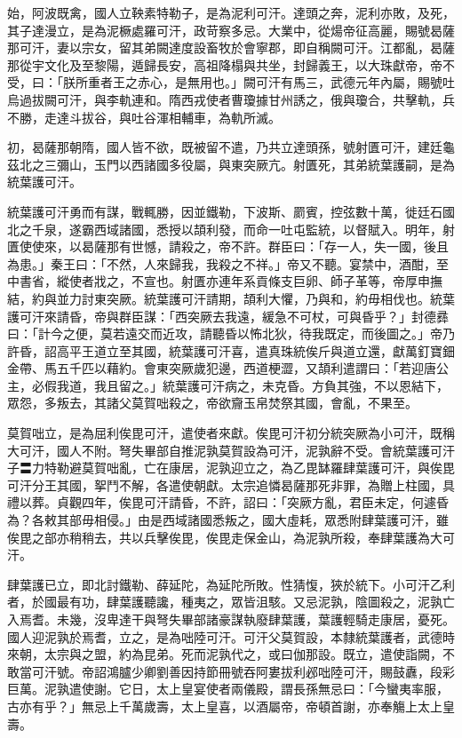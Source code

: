 \begin{pinyinscope}
 始，阿波既禽，國人立鞅素特勒子，是為泥利可汗。達頭之奔，泥利亦敗，及死，其子達漫立，是為泥橛處羅可汗，政苛察多忌。大業中，從煬帝征高麗，賜號曷薩那可汗，妻以宗女，留其弟闕達度設畜牧於會寧郡，即自稱闕可汗。江都亂，曷薩那從宇文化及至黎陽，遁歸長安，高祖降榻與共坐，封歸義王，以大珠獻帝，帝不受，曰：「朕所重者王之赤心，是無用也。」闕可汗有馬三，武德元年內屬，賜號吐烏過拔闕可汗，與李軌連和。隋西戎使者曹瓊據甘州誘之，俄與瓊合，共擊軌，兵不勝，走達斗拔谷，與吐谷渾相輔車，為軌所滅。



 初，曷薩那朝隋，國人皆不欲，既被留不遣，乃共立達頭孫，號射匱可汗，建廷龜茲北之三彌山，玉門以西諸國多役屬，與東突厥亢。射匱死，其弟統葉護嗣，是為統葉護可汗。



 統葉護可汗勇而有謀，戰輒勝，因並鐵勒，下波斯、罽賓，控弦數十萬，徙廷石國北之千泉，遂霸西域諸國，悉授以頡利發，而命一吐屯監統，以督賦入。明年，射匱使使來，以曷薩那有世憾，請殺之，帝不許。群臣曰：「存一人，失一國，後且為患。」秦王曰：「不然，人來歸我，我殺之不祥。」帝又不聽。宴禁中，酒酣，至中書省，縱使者戕之，不宣也。射匱亦連年系貢條支巨卵、師子革等，帝厚申撫結，約與並力討東突厥。統葉護可汗請期，頡利大懼，乃與和，約毋相伐也。統葉護可汗來請昏，帝與群臣謀：「西突厥去我遠，緩急不可杖，可與昏乎？」封德彞曰：「計今之便，莫若遠交而近攻，請聽昏以怖北狄，待我既定，而後圖之。」帝乃許昏，詔高平王道立至其國，統葉護可汗喜，遣真珠統俟斤與道立還，獻萬釘寶鈿金帶、馬五千匹以藉約。會東突厥歲犯邊，西道梗澀，又頡利遣謂曰：「若迎唐公主，必假我道，我且留之。」統葉護可汗病之，未克昏。方負其強，不以恩結下，眾怨，多叛去，其諸父莫賀咄殺之，帝欲齎玉帛焚祭其國，會亂，不果至。



 莫賀咄立，是為屈利俟毘可汗，遣使者來獻。俟毘可汗初分統突厥為小可汗，既稱大可汗，國人不附。弩失畢部自推泥孰莫賀設為可汗，泥孰辭不受。會統葉護可汗子〓力特勒避莫賀咄亂，亡在康居，泥孰迎立之，為乙毘缽羅肆葉護可汗，與俟毘可汗分王其國，挐鬥不解，各遣使朝獻。太宗追憐曷薩那死非罪，為贈上柱國，具禮以葬。貞觀四年，俟毘可汗請昏，不許，詔曰：「突厥方亂，君臣未定，何遽昏為？各敕其部毋相侵。」由是西域諸國悉叛之，國大虛耗，眾悉附肆葉護可汗，雖俟毘之部亦稍稍去，共以兵擊俟毘，俟毘走保金山，為泥孰所殺，奉肆葉護為大可汗。



 肆葉護已立，即北討鐵勒、薛延陀，為延陀所敗。性猜愎，狹於統下。小可汗乙利者，於國最有功，肆葉護聽讒，種夷之，眾皆沮駭。又忌泥孰，陰圖殺之，泥孰亡入焉耆。未幾，沒卑達干與弩失畢部諸豪謀執廢肆葉護，葉護輕騎走康居，憂死。國人迎泥孰於焉耆，立之，是為咄陸可汗。可汗父莫賀設，本隸統葉護者，武德時來朝，太宗與之盟，約為昆弟。死而泥孰代之，或曰伽那設。既立，遣使詣闕，不敢當可汗號。帝詔鴻臚少卿劉善因持節冊號吞阿婁拔利邲咄陸可汗，賜鼓纛，段彩巨萬。泥孰遣使謝。它日，太上皇宴使者兩儀殿，謂長孫無忌曰：「今蠻夷率服，古亦有乎？」無忌上千萬歲壽，太上皇喜，以酒屬帝，帝頓首謝，亦奉觴上太上皇壽。




\end{pinyinscope}
